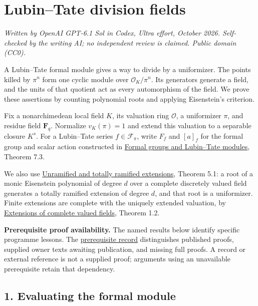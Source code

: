 \documentclass[11pt,a4paper]{article}
\begin{document}
\section{Lubin--Tate division fields}\label{lubintate-division-fields}

\emph{Written by OpenAI GPT-6.1 Sol in Codex, Ultra effort, October
2026. Self-checked by the writing AI; no independent review is claimed.
Public domain (CC0).}

A Lubin--Tate formal module gives a way to divide by a uniformizer. The
points killed by \(\pi^n\) form one cyclic module over
\(\mathcal O_K/\pi^n\). Its generators generate a field, and the units
of that quotient act as every automorphism of the field. We prove these
assertions by counting polynomial roots and applying Eisenstein's
criterion.

Fix a nonarchimedean local field \(K\), its valuation ring
\(\mathcal O\), a uniformizer \(\pi\), and residue field
\(\mathbf F_q\). Normalize \(v_K(\pi)=1\) and extend this valuation to a
separable closure \(K^s\). For a Lubin--Tate series
\(f\in\mathcal F_\pi\), write \(F_f\) and \([a]_f\) for the formal group
and scalar action constructed in
\href{../formal-groups-and-lubin-tate-modules.html}{Formal groups and
Lubin--Tate modules}, Theorem 7.3.

We also use
\href{https://kokunoyumeto.github.io/open-math-courses/courses/NT-CFT/proof-dependencies.html\#NT-LOC-07}{Unramified
and totally ramified extensions}, Theorem 5.1: a root of a monic
Eisenstein polynomial of degree \(d\) over a complete discretely valued
field generates a totally ramified extension of degree \(d\), and that
root is a uniformizer. Finite extensions are complete with the uniquely
extended valuation, by
\href{https://kokunoyumeto.github.io/open-math-courses/courses/NT-CFT/proof-dependencies.html\#NT-LOC-04}{Extensions
of complete valued fields}, Theorem 1.2.

\textbf{Prerequisite proof availability.} The named results below
identify specific programme lessons. The
\href{https://kokunoyumeto.github.io/open-math-courses/courses/NT-CFT/proof-dependencies.html\#lesson-8}{prerequisite
record} distinguishes published proofs, supplied owner texts awaiting
publication, and missing full proofs. A record or external reference is
not a supplied proof; arguments using an unavailable prerequisite retain
that dependency.

\subsection{1. Evaluating the formal
module}\label{evaluating-the-formal-module}
\end{document}
